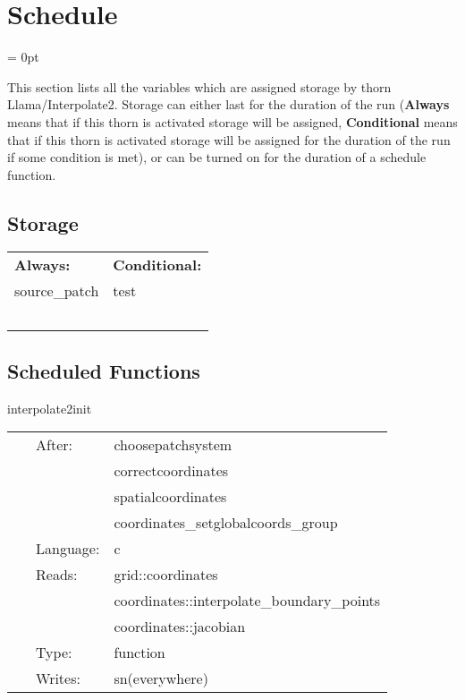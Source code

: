 
\section{Schedule} 


\parskip = 0pt


\noindent This section lists all the variables which are assigned storage by thorn Llama/Interpolate2.  Storage can either last for the duration of the run ({\bf Always} means that if this thorn is activated storage will be assigned, {\bf Conditional} means that if this thorn is activated storage will be assigned for the duration of the run if some condition is met), or can be turned on for the duration of a schedule function.


\subsection*{Storage}

\hspace{5mm}

 \begin{tabular*}{160mm}{ll} 

{\bf Always:}& {\bf Conditional:} \\ 
 source\_patch &  test\\ 
~ & ~\\ 
\end{tabular*} 


\subsection*{Scheduled Functions}
\vspace{5mm}


\hspace{5mm} interpolate2init 

\hspace{5mm}{\it initialise interpolating inter-patch boundaries } 


\hspace{5mm}

 \begin{tabular*}{160mm}{cll} 
~ & After:  & choosepatchsystem \\ 
~& ~ &correctcoordinates\\ 
~& ~ &spatialcoordinates\\ 
~& ~ &coordinates\_setglobalcoords\_group\\ 
~ & Language:  & c \\ 
~ & Reads:  & grid::coordinates \\ 
~& ~ &coordinates::interpolate\_boundary\_points\\ 
~& ~ &coordinates::jacobian\\ 
~ & Type:  & function \\ 
~ & Writes:  & sn(everywhere) \\ 
\end{tabular*} 


